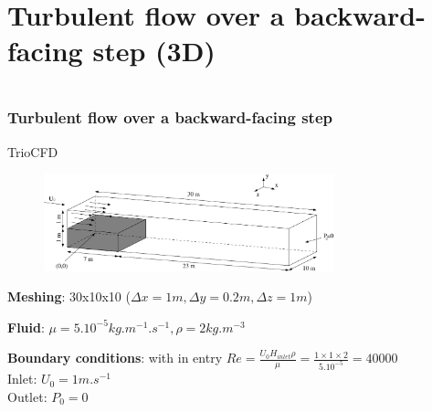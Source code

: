 \documentclass[10pt, hyperref={unicode=true,pdfusetitle, bookmarks=true,bookmarksnumbered=false,bookmarksopen=false, breaklinks=false,pdfborder={0 0 1},backref=true,colorlinks=true,linkcolor=darkblue,pageanchor}]{beamer}
\begin{document}
\section{{\bf{Turbulent flow over a backward-facing step (3D)}}}
\begin{frame}
\begin{columns}[c] 
\tableofcontents[sections={1-9},currentsection, currentsubsection]
\tableofcontents[sections={10-16},currentsection, currentsubsection]
\end{columns}
\end{frame}
\begin{frame}
\frametitle{Turbulent flow over a backward-facing step}
\begin{block}{TrioCFD}

\begin{figure}
\includegraphics[width=0.75\textwidth]{PICTURES/marche3D.pdf}
\end{figure}

\textbf{Meshing}: 30x10x10 ($\Delta x=1m, \Delta y=0.2m, \Delta z=1m$)

\textbf{Fluid}: $\mu=5.10^{-5} kg.m^{-1}.s^{-1}, \rho=2 kg.m^{-3}$

\textbf{Boundary conditions}: with in entry $Re=\frac{U_0 H_{inlet} \rho}{\mu} = \frac{1 \times 1 \times 2}{5.10^{-5}} = 40000$\\
Inlet: $U_0=1 m.s^{-1}$\\
Outlet: $P_0=0$

\end{block}
\end{frame}
\end{document}
